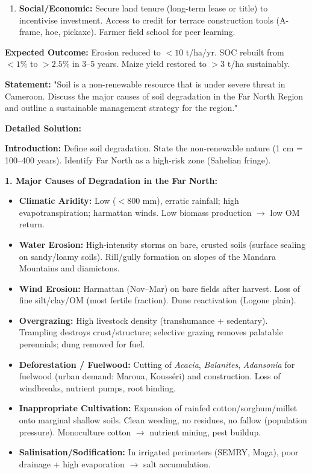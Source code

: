 \documentclass[11pt]{article}
\begin{document}
\begin{exemplebox}
\begin{enumerate}
    \item \textbf{Social/Economic:} Secure land tenure (long-term lease or title) to incentivise investment. Access to credit for terrace construction tools (A-frame, hoe, pickaxe). Farmer field school for peer learning.
\end{enumerate}
\textbf{Expected Outcome:} Erosion reduced to $< 10$ t/ha/yr. SOC rebuilt from $< 1\%$ to $> 2.5\%$ in 3–5 years. Maize yield restored to $> 3$ t/ha sustainably.
\end{exemplebox}

\begin{exoresolu}
\textbf{Statement:} "Soil is a non-renewable resource that is under severe threat in Cameroon. Discuss the major causes of soil degradation in the Far North Region and outline a sustainable management strategy for the region."

\tcblower

\textbf{Detailed Solution:}

\textbf{Introduction:} Define soil degradation. State the non-renewable nature (1 cm = 100–400 years). Identify Far North as a high-risk zone (Sahelian fringe).

\textbf{1. Major Causes of Degradation in the Far North:}
\begin{itemize}
    \item \textbf{Climatic Aridity:} Low ($< 800$ mm), erratic rainfall; high evapotranspiration; harmattan winds. Low biomass production $\rightarrow$ low OM return.
    \item \textbf{Water Erosion:} High-intensity storms on bare, crusted soils (surface sealing on sandy/loamy soils). Rill/gully formation on slopes of the Mandara Mountains and diamictons.
    \item \textbf{Wind Erosion:} Harmattan (Nov–Mar) on bare fields after harvest. Loss of fine silt/clay/OM (most fertile fraction). Dune reactivation (Logone plain).
    \item \textbf{Overgrazing:} High livestock density (transhumance + sedentary). Trampling destroys crust/structure; selective grazing removes palatable perennials; dung removed for fuel.
    \item \textbf{Deforestation / Fuelwood:} Cutting of \emph{Acacia}, \emph{Balanites}, \emph{Adansonia} for fuelwood (urban demand: Maroua, Kousséri) and construction. Loss of windbreaks, nutrient pumps, root binding.
    \item \textbf{Inappropriate Cultivation:} Expansion of rainfed cotton/sorghum/millet onto marginal shallow soils. Clean weeding, no residues, no fallow (population pressure). Monoculture cotton $\rightarrow$ nutrient mining, pest buildup.
    \item \textbf{Salinisation/Sodification:} In irrigated perimeters (SEMRY, Maga), poor drainage + high evaporation $\rightarrow$ salt accumulation.
\end{itemize}


\end{exoresolu}
\end{document}
